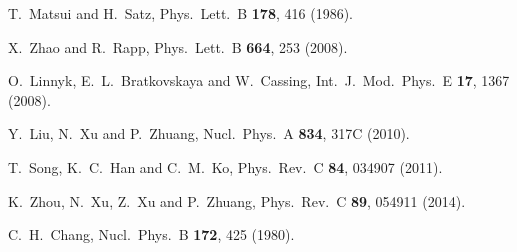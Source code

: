 \documentclass[twocolumn,aps,superscriptaddress,showpacs,nofootinbib,floatfix]{revtex4}
\begin{document}
\begin{thebibliography}{99}

  T.~Matsui and H.~Satz,
  Phys.\ Lett.\ B {\bf 178}, 416 (1986).

  X.~Zhao and R.~Rapp,
  Phys.\ Lett.\  B {\bf 664}, 253 (2008).

  O.~Linnyk, E.~L.~Bratkovskaya and W.~Cassing,
  Int.\ J.\ Mod.\ Phys.\ E {\bf 17}, 1367 (2008).

  Y.~Liu, N.~Xu and P.~Zhuang,
  Nucl.\ Phys.\ A {\bf 834}, 317C (2010).

  T.~Song, K.~C.~Han and C.~M.~Ko,
  Phys.\ Rev.\ C {\bf 84}, 034907 (2011).

  K.~Zhou, N.~Xu, Z.~Xu and P.~Zhuang,
  Phys.\ Rev.\ C {\bf 89}, 054911 (2014).

  C.~H.~Chang,
  Nucl.\ Phys.\ B {\bf 172}, 425 (1980).


\end{thebibliography}
\end{document}
